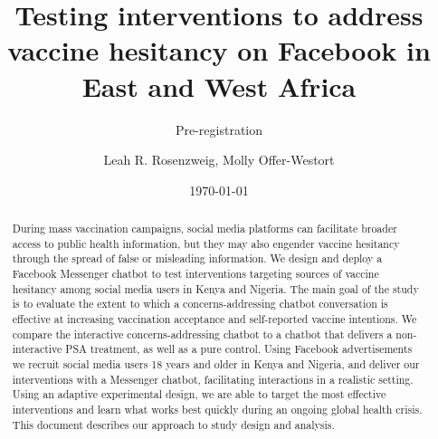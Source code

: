 \documentclass[letterpaper, 12pt, parskip=full,DIV=10]{scrartcl}
\title{Testing interventions to address vaccine hesitancy on Facebook in East and West Africa}
\subtitle{Pre-registration}
\author{Leah R. Rosenzweig, Molly Offer-Westort}
\date{\today}
\begin{document}
%
\normalsize%
\maketitle%

\begin{abstract}
During mass vaccination campaigns, social media platforms can facilitate broader access to public health information, but they may also engender vaccine hesitancy through the spread of false or misleading information. We design and deploy a Facebook Messenger chatbot to test interventions targeting sources of vaccine hesitancy among social media users in Kenya and Nigeria. The main goal of the study is to evaluate the extent to which a concerns-addressing chatbot conversation is effective at increasing vaccination acceptance and self-reported vaccine intentions. We compare the interactive concerns-addressing chatbot to a chatbot that delivers a non-interactive PSA treatment, as well as a pure control. Using Facebook advertisements we recruit social media users 18 years and older in Kenya and Nigeria, and deliver our interventions with a Messenger chatbot, facilitating interactions in a realistic setting. Using an adaptive experimental design, we are able to target the most effective interventions and learn what works best quickly during an ongoing global health crisis. This document describes our approach to study design and analysis. 

\end{abstract}

\clearpage

\tableofcontents%
\clearpage
\end{document}

